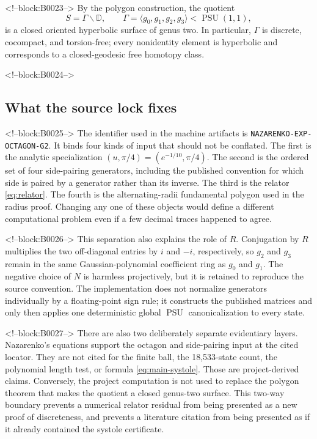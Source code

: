 \documentclass[11pt,a4paper]{article}
\theoremstyle{definition}
\newcommand{\D}{\mathbb D}
\newcommand{\PSU}{\operatorname{PSU}}
\begin{document}
<!--block:B0023-->
By the polygon construction, the quotient
\[
 S=\Gamma\backslash\D,
 \qquad \Gamma=\langle g_0,g_1,g_2,g_3\rangle<\PSU(1,1),
\]
is a closed oriented hyperbolic surface of genus two.  In particular,
\(\Gamma\) is discrete, cocompact, and torsion-free; every nonidentity element
is hyperbolic and corresponds to a closed-geodesic free homotopy class.

<!--block:B0024-->
\subsection{What the source lock fixes}

<!--block:B0025-->
The identifier used in the machine artifacts is
\texttt{NAZARENKO-EXP-OCTAGON-G2}.  It binds four kinds of input that should
not be conflated.  The first is the analytic specialization
\((u,\pi/4)=(e^{-1/10},\pi/4)\).  The second is the ordered set of four
side-pairing generators, including the published convention for which side is
paired by a generator rather than its inverse.  The third is the relator
\eqref{eq:relator}.  The fourth is the alternating-radii fundamental polygon
used in the radius proof.  Changing any one of these objects would define a
different computational problem even if a few decimal traces happened to
agree.

<!--block:B0026-->
This separation also explains the role of \(R\).  Conjugation by \(R\)
multiplies the two off-diagonal entries by \(i\) and \(-i\), respectively, so
\(g_2\) and \(g_3\) remain in the same Gaussian-polynomial coefficient ring as
\(g_0\) and \(g_1\).  The negative choice of \(N\) is harmless projectively,
but it is retained to reproduce the source convention.  The implementation
does not normalize generators individually by a floating-point sign rule; it
constructs the published matrices and only then applies one deterministic
global \(\PSU\) canonicalization to every state.

<!--block:B0027-->
There are also two deliberately separate evidentiary layers.  Nazarenko's
equations support the octagon and side-pairing input at the cited locator.
They are not cited for the finite ball, the 18,533-state count, the polynomial
length test, or formula \eqref{eq:main-systole}.  Those are project-derived
claims.  Conversely, the project computation is not used to replace the
polygon theorem that makes the quotient a closed genus-two surface.  This
two-way boundary prevents a numerical relator residual from being presented
as a new proof of discreteness, and prevents a literature citation from being
presented as if it already contained the systole certificate.
\end{document}
